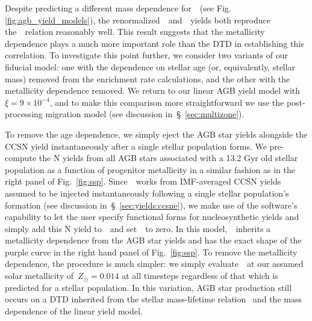 \documentclass[ms.tex]{subfiles}
\begin{document}
Despite predicting a different mass dependence for~~(see Fig.
\ref{fig:agb_yield_models}), the renormalized~\cristallo~and~\ventura~yields
both reproduce the~\ohno~relation reasonably well.
This result suggests that the metallicity dependence plays a much more
important role than the DTD in establishing this correlation.
To investigate this point further, we consider two variants of our fiducial
model: one with the dependence on stellar age (or, equivalently, stellar mass)
removed from the enrichment rate calculations, and the other with the
metallicity dependence removed.
We return to our linear AGB yield model with~$\xi = 9\times10^{-4}$, and
to make this comparison more straightforward we use the post-processing
migration model (see discussion in~\S~\ref{sec:multizone}).
\par
To remove the age dependence, we simply eject the AGB star yields alongside
the CCSN yield instantaneously after a single stellar population forms.
We pre-compute the N yields from all AGB stars associated with a 13.2 Gyr old
stellar population as a function of progenitor metallicity in a similar fashion
as in the right panel of Fig.~\ref{fig:ssp}.
Since~\vice~works from IMF-averaged CCSN yields assumed to be injected
instantaneously following a single stellar population's formation (see
discussion in~\S~\ref{sec:yields:ccsne}), we make use of the software's
capability to let the user specify functional forms for nucleosynthetic yields
and simply add this N yield to~~and set~~to zero.
In this model,~~inherits a metallicity dependence from the AGB star
yields and has the exact shape of the purple curve in the right hand panel of
Fig.~\ref{fig:ssp}.
To remove the metallicity dependence, the procedure is much simpler: we simply
evaluate~~at our assumed solar metallicity of~$Z_\odot = 0.014$ at all
timesteps regardless of that which is predicted for a stellar population.
In this variation, AGB star production still occurs on a DTD inherited from
the stellar mass-lifetime relation~\citep{Larson1974} and the mass dependence
of the linear yield model.
\par
\end{document}
